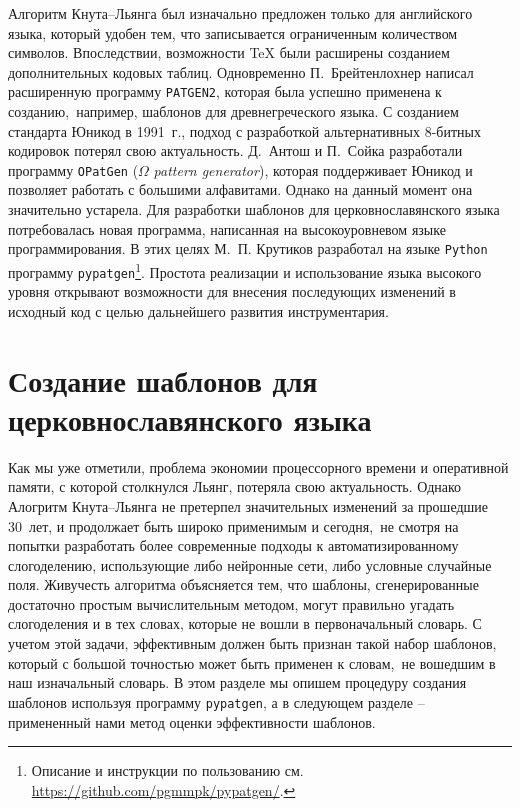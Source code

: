 \documentclass[12pt,a4paper,oneside]{extarticle}
\begin{document}
Алгоритм Кнута--Льянга был изначально предложен только для английского языка, который удобен тем, что записывается ограниченным количеством символов. Впоследствии, возможности \TeX{} были расширены созданием дополнительных кодовых таблиц\autocite[Кодировка \textenglish{Extended \TeX{} Font Encoding Scheme} (ET). См. ][]{ferguson1990}. Одновременно П.~Брейтенлохнер написал расширенную программу \verb+PATGEN2+\autocite[См. описание в пособии ][]{patgen2}, которая была успешно применена к созданию, например, шаблонов для древнегреческого языка\autocite[][]{haralambous1992}. С созданием стандарта Юникод в 1991~г., подход с разработкой альтернативных 8-битных кодировок потерял свою актуальность. Д.~Антош и  П.~Сойка разработали программу \texttt{OPatGen} ($\Omega$ \emph{pattern generator}), которая поддерживает Юникод и позволяет работать с большими алфавитами\autocite[][]{sojka2003}. Однако на данный момент она значительно устарела. Для разработки шаблонов для церковнославянского языка потребовалась новая программа, написанная на  высокоуровневом языке программирования. В этих целях М.~П. Крутиков разработал на языке \verb+Python+ программу \verb+pypatgen+\footnote{Описание и инструкции по пользованию см. \url{https://github.com/pgmmpk/pypatgen/}.}. Простота реализации и использование языка высокого уровня открывают возможности для внесения последующих изменений в исходный код с целью дальнейшего развития инструментария.

\section{Создание шаблонов для церковнославянского языка}

Как мы уже отметили, проблема экономии процессорного времени и оперативной памяти, с которой столкнулся Льянг, потеряла свою актуальность. Однако Алогритм Кнута--Льянга не претерпел значительных изменений за прошедшие 30~лет, и продолжает быть широко применимым и сегодня, не смотря на попытки разработать более современные подходы к автоматизированному слогоделению, использующие либо нейронные сети\autocite[К примеру, ][]{smrz1996}, либо условные случайные поля\autocite[К примеру, см. ][]{trogkanis2010}. Живучесть алгоритма объясняется тем, что шаблоны, сгенерированные достаточно простым вычислительным методом, могут правильно угадать слогоделения и в тех словах, которые не вошли в первоначальный словарь. С учетом этой задачи, эффективным должен быть признан такой набор шаблонов, который с большой точностью может быть применен к словам, не вошедшим в наш изначальный словарь. В этом разделе мы опишем процедуру создания шаблонов используя программу \verb+pypatgen+, а в следующем разделе -- примененный нами метод оценки эффективности шаблонов.
\end{document}
